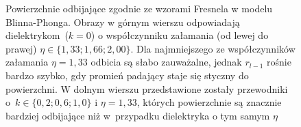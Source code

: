\begin{figure}[H]
\centering
{}

\caption[Powierzchnie odbijające zgodnie ze wzorami Fresnela]{Powierzchnie odbijające zgodnie ze wzorami Fresnela w modelu Blinna-Phonga. Obrazy w górnym wierszu odpowiadają dielektrykom~($k=0$) o współczynniku załamania (od lewej do prawej) $\eta\in\lbrace 1,33; 1,66; 2,00 \rbrace$. Dla najmniejszego ze współczynników załamania $\eta=1,33$ odbicia są słabo zauważalne, jednak $r_{l-1}$ rośnie bardzo szybko, gdy promień padający staje się styczny do powierzchni. W dolnym wierszu przedstawione zostały przewodniki o~$k\in\lbrace 0,2; 0,6; 1,0 \rbrace$ i $\eta = 1,33$, których powierzchnie są znacznie bardziej odbijające niż w~przypadku dielektryka o tym samym $\eta$}
\label{ch3:img:reflection_types_fresnel}
\end{figure}

